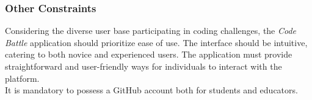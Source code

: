 \subsubsection{Other Constraints}
Considering the diverse user base participating in coding challenges, the \textit{Code Battle} application should prioritize ease of use. The interface should be intuitive, catering to both novice and experienced users. The application must provide straightforward and user-friendly ways for individuals to interact with the platform. \\
It is mandatory to possess a GitHub account both for students and educators.
